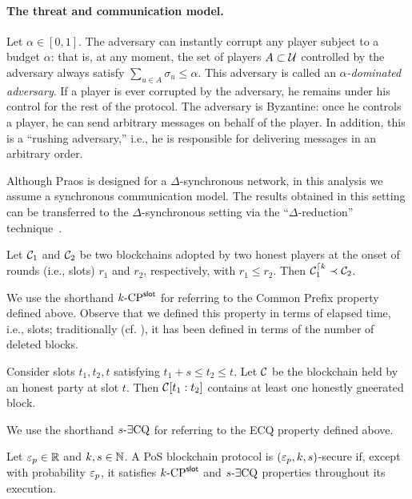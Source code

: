\paragraph{The threat and communication model.} 
Let $\alpha \in [0,1]$. 
The adversary can instantly corrupt any player subject to 
a budget $\alpha$: that is, 
at any moment, the set of players $A \subset \mathcal{U}$ controlled by the adversary 
always satisfy $\sum_{u \in A} \sigma_u \leq \alpha$. 
This adversary is called an \emph{$\alpha$-dominated adversary}. 
If a player is ever corrupted by the adversary, 
he remains under his control for the rest of the protocol. 
The adversary is Byzantine: 
once he controls a player, he can send arbitrary messages on behalf of the player. 
In addition, this is a ``rushing adversary,'' 
i.e., 
he is responsible for delivering messages in an arbitrary order.

Although Praos is designed for a $\Delta$-synchronous network, 
in this analysis we assume a synchronous communication model. 
The results obtained in this setting can be transferred 
to the $\Delta$-synchronous setting via 
the ``$\Delta$-reduction'' technique~\cite{Praos}.



\begin{definition}\label{def:cp}        
    Let $\mathcal{C}_1$ and $\mathcal{C}_2$ be two blockchains adopted by two honest players 
    at the onset of rounds (i.e., slots) $r_1$ and $r_2$, respectively, with $r_1 \leq r_2$. 
    Then $\mathcal{C}_1^{\lceil {k}} \prec \mathcal{C}_2$. 
\end{definition}
We use the shorthand ${k}\text{-}\mathrm{CP}^{\mathsf{slot}}$ for referring to the Common Prefix property defined above. 
Observe that we defined this property in terms of elapsed time, i.e., slots; 
traditionally (cf. \cite{GKL17}), it has been defined in terms of the number of deleted blocks. 


\begin{definition}\label{def:ECQ}        
    Consider slots $t_1, t_2, t$ satisfying $t_1 + s \leq t_2 \leq t$. 
    Let $\mathcal{C}$ be the blockchain held by an honest party at slot $t$. 
    Then $\mathcal{C}[t_1:t_2]$ contains at least one 
    honestly gneerated block.
\end{definition}
We use the shorthand ${s}\text{-}\exists\mathrm{CQ}$ for referring to the ECQ property defined above. 

\smallskip
\begin{definition}\label{def:blockchain-security}
    Let $\mathsf{\varepsilon}_p \in \mathbb{R}$ and $k, s \in \mathbb{N}$. 
    A PoS blockchain protocol is $(\mathsf{\varepsilon}_p, k, s)$-secure if, 
    except with probability $\mathsf{\varepsilon}_p$, 
    it satisfies ${k}\text{-}\mathrm{CP}^{\mathsf{slot}}$ and ${s}\text{-}\exists\mathrm{CQ}$ properties 
    throughout its execution.
\end{definition}





